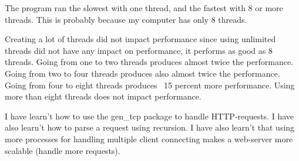 \documentclass[a4paper, 11pt]{article}
\begin{document}
The program ran the slowest with one thread, and the fastest with 8 or more threads. This is probably because my computer has only 8 threads.

Creating a lot of threads did not impact performance since using unlimited threads did not have any impact on performance, it performs as good as 8 threads.
Going from one to two threads produces almost twice the performance.
Going from two to four threads produces also almost twice the performance.
Going from four to eight threads produces ~15 percent more performance.
Using more than eight threads does not impact performance.

I have learn't how to use the gen\_tcp package to handle HTTP-requests. I have also learn't how to parse a request using recursion.
I have also learn't that using more processes for handling multiple client connecting makes a web-server more scalable (handle more requests).
\end{document}
